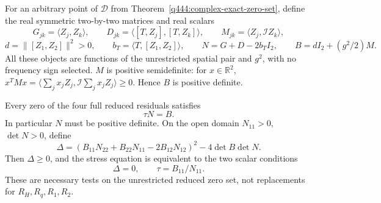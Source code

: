 For an arbitrary point of $\mathcal D$ from
Theorem~\ref{q444:complex-exact-zero-set}, define the real
symmetric two-by-two matrices and real scalars
\[
G_{jk}=\langle Z_j,Z_k\rangle,\qquad
D_{jk}=\langle[T,Z_j],[T,Z_k]\rangle,\qquad
M_{jk}=\langle Z_j,\mathcal IZ_k\rangle,
\]
\[
d=\|[Z_1,Z_2]\|^2>0,\qquad
b_T=\langle T,[Z_1,Z_2]\rangle,
\qquad N=G+D-2b_TI_2,\qquad B=dI_2+(g^2/2)M.
\]
All these objects are functions of the unrestricted spatial pair and
$g^2$, with no frequency sign selected. $M$ is positive semidefinite:
for $x\in\mathbb R^2$, $x^TMx=\langle\sum_jx_jZ_j,
\mathcal I\sum_jx_jZ_j\rangle\ge0$. Hence $B$ is positive definite.

\begin{proposition}
\label{q444:complex-stress-obstruction}
Every zero of the four full reduced residuals satisfies
\begin{equation}
\tau N=B.
\label{q444:complex-stress-matrix-equation}
\end{equation}
In particular $N$ must be positive definite. On the open domain
$N_{11}>0$, $\det N>0$, define
\begin{equation}
\Delta=(B_{11}N_{22}+B_{22}N_{11}-2B_{12}N_{12})^2
-4\det B\det N.
\label{q444:complex-stress-discriminant}
\end{equation}
Then $\Delta\ge0$, and the stress equation is equivalent to the two
scalar conditions
\begin{equation}
\Delta=0,\qquad \tau=B_{11}/N_{11}.
\label{q444:complex-stress-filter}
\end{equation}
These are necessary tests on the unrestricted reduced zero set, not
replacements for $R_H,R_q,R_1,R_2$.
\end{proposition}

